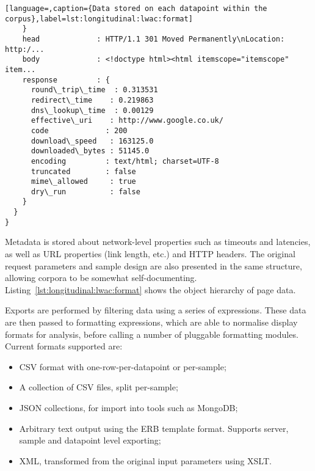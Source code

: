 \begin{lstlisting}[language=,caption={Data stored on each datapoint within the corpus},label=lst:longitudinal:lwac:format]
    }
    head             : HTTP/1.1 301 Moved Permanently\nLocation: http:/...
    body             : <!doctype html><html itemscope="itemscope" item...
    response         : {
      round\_trip\_time  : 0.313531                                          
      redirect\_time    : 0.219863                                          
      dns\_lookup\_time  : 0.00129                                           
      effective\_uri    : http://www.google.co.uk/                          
      code             : 200                                               
      download\_speed   : 163125.0                                          
      downloaded\_bytes : 51145.0                                           
      encoding         : text/html; charset=UTF-8                          
      truncated        : false                                             
      mime\_allowed     : true                                              
      dry\_run          : false                                             
    }
  }
}
\end{lstlisting}

Metadata is stored about network-level properties such as timeouts and latencies, as well as URL properties (link length, etc.) and HTTP headers.  The original request parameters and sample design are also presented in the same structure, allowing corpora to be somewhat self-documenting.  Listing~\ref{lst:longitudinal:lwac:format} shows the object hierarchy of page data.

Exports are performed by filtering data using a series of expressions.  These data are then passed to formatting expressions, which are able to normalise display formats for analysis, before calling a number of pluggable formatting modules.  Current formats supported are:

\begin{itemize}
    \item CSV format with one-row-per-datapoint or per-sample;
    \item A collection of CSV files, split per-sample;
    \item JSON collections, for import into tools such as MongoDB;
    \item Arbitrary text output using the ERB template format.  Supports server, sample and datapoint level exporting;
    \item XML, transformed from the original input parameters using XSLT.
\end{itemize}





